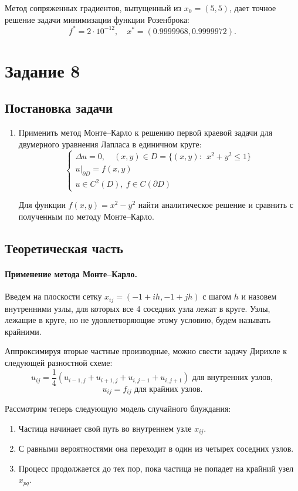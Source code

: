 \documentclass[16pt]{article}
\begin{document}
Метод сопряженных градиентов, выпущенный из $x_0 = (5, 5)$, дает точное решение задачи минимизации функции Розенброка:
$$f^* = 2 \cdot 10^{-12}, \quad x^* = (0.9999968, 0.9999972).$$
\section{Задание 8}
\subsection{Постановка задачи}
\begin{enumerate}
	\item Применить метод Монте--Карло к решению первой краевой задачи для двумерного уравнения Лапласа в единичном круге:
$$
\begin{cases}
\Delta u = 0, \quad (x, y) \in D = \{(x, y)\colon \ \ x^2 + y^2 \leq 1\}\\
u|_{\partial D} = f(x, y) \\
u \in C^2(D), \ f \in C(\partial D)
\end{cases}
$$

Для функции $f(x, y) = x^2 - y^2$ найти аналитическое решение и сравнить с полученным по методу Монте--Карло.
\end{enumerate}
\subsection{Теоретическая часть}
\paragraph{Применение метода Монте--Карло.}
Введем на плоскости сетку $x_{ij} = (-1 + ih, -1 + jh)$ с шагом $h$ и назовем внутренними узлы, для которых все 4 соседних узла лежат в круге. Узлы, лежащие в круге, но не удовлетворяющие этому условию, будем называть крайними. 

Аппроксимируя вторые частные производные, можно свести задачу Дирихле к следующей разностной схеме:
$$u_{ij} = \dfrac14(u_{i-1,j} + u_{i+1, j} + u_{i, j-1} + u_{i,j+1}) \text{ для внутренних узлов},$$
$$u_{ij} = f_{ij} \text{ для крайних узлов}.$$

Рассмотрим теперь следующую модель случайного блуждания: 
\begin{enumerate}
	\item Частица начинает свой путь во внутреннем узле $x_{ij}$.
	\item С равными вероятностями она переходит в один из четырех соседних узлов.
	\item Процесс продолжается до тех пор, пока частица не попадет на крайний узел $x_{pq}$.
\end{enumerate}
\end{document}
